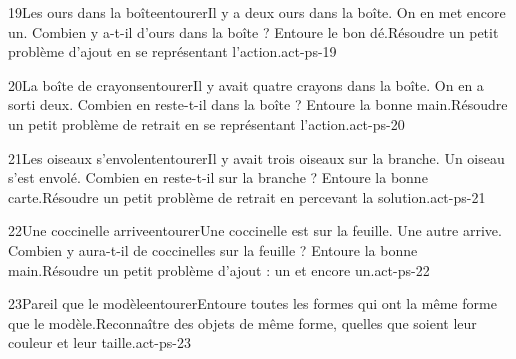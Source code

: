 \begin{activite}{19}{Les ours dans la boîte}{entourer}{Il y a deux ours dans la boîte. On en met encore un. Combien y a-t-il d’ours dans la boîte ? Entoure le bon dé.}{Résoudre un petit problème d’ajout en se représentant l’action.}{act-ps-19}
\end{activite}
\begin{activite}{20}{La boîte de crayons}{entourer}{Il y avait quatre crayons dans la boîte. On en a sorti deux. Combien en reste-t-il dans la boîte ? Entoure la bonne main.}{Résoudre un petit problème de retrait en se représentant l’action.}{act-ps-20}
\end{activite}
\begin{activite}{21}{Les oiseaux s’envolent}{entourer}{Il y avait trois oiseaux sur la branche. Un oiseau s’est envolé. Combien en reste-t-il sur la branche ? Entoure la bonne carte.}{Résoudre un petit problème de retrait en percevant la solution.}{act-ps-21}
\end{activite}
\begin{activite}{22}{Une coccinelle arrive}{entourer}{Une coccinelle est sur la feuille. Une autre arrive. Combien y aura-t-il de coccinelles sur la feuille ? Entoure la bonne main.}{Résoudre un petit problème d’ajout : un et encore un.}{act-ps-22}
\end{activite}
\begin{activite}{23}{Pareil que le modèle}{entourer}{Entoure toutes les formes qui ont la {\otBold\color{otNavy}même forme} que le modèle.}{Reconnaître des objets de même forme, quelles que soient leur couleur et leur taille.}{act-ps-23}
\end{activite}
